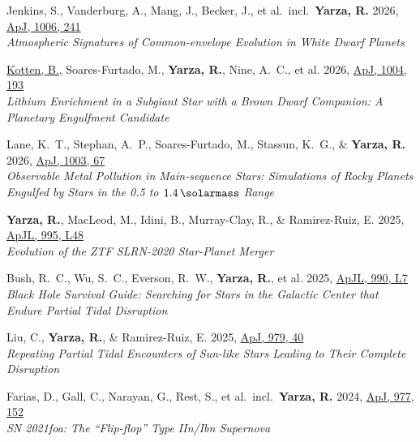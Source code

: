 \item Jenkins, S., Vanderburg, A., Mang, J., Becker, J., et al.\ incl.\ \textbf{Yarza, R.} 2026, \href{https://ui.adsabs.harvard.edu/abs/2026ApJ..1006..241J}{ApJ, 1006, 241}\\\textit{Atmospheric Signatures of Common-envelope Evolution in White Dwarf Planets}

\item \underline{Kotten, B.}, Soares-Furtado, M., \textbf{Yarza, R.}, Nine, A.~C., et al. 2026, \href{https://ui.adsabs.harvard.edu/abs/2026ApJ..1004..193K}{ApJ, 1004, 193}\\\textit{Lithium Enrichment in a Subgiant Star with a Brown Dwarf Companion: A Planetary Engulfment Candidate}

\item Lane, K.~T., Stephan, A.~P., Soares-Furtado, M., Stassun, K.~G., \& \textbf{Yarza, R.} 2026, \href{https://ui.adsabs.harvard.edu/abs/2026ApJ..1003...67L}{ApJ, 1003, 67}\\\textit{Observable Metal Pollution in Main-sequence Stars: Simulations of Rocky Planets Engulfed by Stars in the 0.5 to \( \qty{1.4}{\solarmass} \) Range}

\item \textbf{Yarza, R.}, MacLeod, M., Idini, B., Murray-Clay, R., \& Ramirez-Ruiz, E. 2025, \href{https://ui.adsabs.harvard.edu/abs/2025ApJ...995L..48Y}{ApJL, 995, L48}\\\textit{Evolution of the ZTF SLRN-2020 Star-Planet Merger}

\item Bush, R.~C., Wu, S.~C., Everson, R.~W., \textbf{Yarza, R.}, et al. 2025, \href{https://ui.adsabs.harvard.edu/abs/2025ApJ...990L...7B}{ApJL, 990, L7}\\\textit{Black Hole Survival Guide: Searching for Stars in the Galactic Center that Endure Partial Tidal Disruption}

\item Liu, C., \textbf{Yarza, R.}, \& Ramirez-Ruiz, E. 2025, \href{https://ui.adsabs.harvard.edu/abs/2025ApJ...979...40L}{ApJ, 979, 40}\\\textit{Repeating Partial Tidal Encounters of Sun-like Stars Leading to Their Complete Disruption}

\item Farias, D., Gall, C., Narayan, G., Rest, S., et al.\ incl.\ \textbf{Yarza, R.} 2024, \href{https://ui.adsabs.harvard.edu/abs/2024ApJ...977..152F}{ApJ, 977, 152}\\\textit{SN 2021foa: The ``Flip-flop'' Type IIn/Ibn Supernova}

